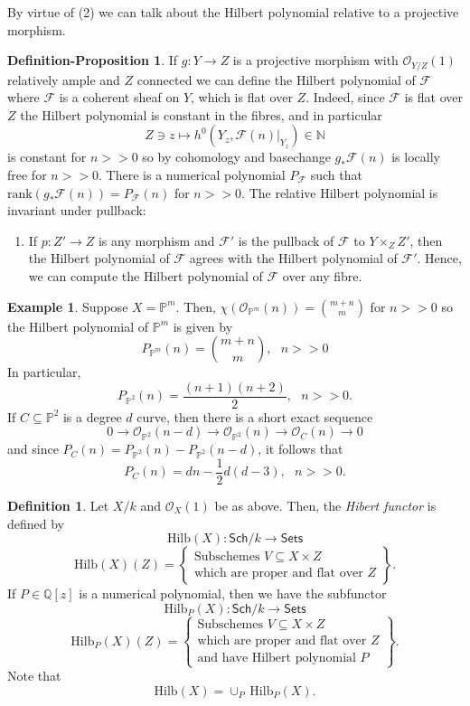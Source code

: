 \documentclass[12pt]{amsart}
\numberwithin{equation}{section}
\theoremstyle{definition}
\newtheorem{definition}[theorem]{Definition}
\newtheorem{example}[theorem]{Example}
\newtheorem{defprop}[theorem]{Definition-Proposition}
\newcommand{\NN}{\mathbb{N}}
\newcommand{\PP}{\mathbb{P}}
\newcommand{\QQ}{\mathbb{Q}}
\newcommand{\cF}{\mathcal{F}}
\newcommand{\Hilb}{\mathrm{Hilb}}
\begin{document}
By virtue of (2) we can talk about the Hilbert polynomial relative to a projective morphism.

\begin{defprop}
    If $g : Y \to Z$ is a projective morphism with $\mathcal{O}_{Y/Z}(1)$ relatively ample and $Z$ connected we can define the Hilbert polynomial of $\cF$ where $\cF$ is a coherent sheaf on $Y$, which is flat over $Z$. 
Indeed, since $\cF$ is flat over $Z$ the Hilbert polynomial is constant in the fibres, and in particular
\[
Z \ni z \mapsto h^0(Y_z, \cF(n) |_{Y_z}) \in \NN
\]
is constant for $n > > 0$ so by cohomology and basechange $g_* \cF(n)$ is locally free for $n > > 0.$
There is a numerical polynomial $P_{\cF}$ such that $\mathrm{rank}(g_*\cF(n)) = P_{\cF}(n)$ for $n > > 0.$
The relative Hilbert polynomial is invariant under pullback:
\begin{enumerate}
    \item If $p : Z' \to Z$ is any morphism and $\cF'$ is the pullback of $\cF$ to $Y \times_Z Z'$, then the Hilbert polynomial of $\cF$ agrees with the Hilbert polynomial of $\cF'.$
    Hence, we can compute the Hilbert polynomial of $\cF$ over any fibre.  
\end{enumerate}
\end{defprop}

\begin{example}
Suppose $X = \PP^m$. Then, $\chi(\mathcal{O}_{\PP^m}(n)) = {{m+n}\choose m}$ for $n > > 0$ so the Hilbert polynomial of $\PP^m$ is given by
\[
P_{\PP^m}(n) = {{m+n}\choose{m}}, \ \ \ n > > 0
\]
In particular,
\[
P_{\PP^2}(n) = \frac{(n+1)(n+2)}{2}, \ \ \ n > > 0.
\]
If $C \subseteq \PP^2$ is a degree $d$ curve, then there is a short exact sequence
\[
0 \to \mathcal{O}_{\PP^2}(n-d) \to \mathcal{O}_{\PP^2}(n) \to \mathcal{O}_C(n) \to 0
\]
and since $P_C(n) = P_{\PP^2}(n) - P_{\PP^2}(n-d)$, it follows that
\[
P_C(n) = dn - \frac{1}{2}d(d-3), \ \ \ n > > 0.
\]
\end{example}    

\begin{definition}
    Let $X/k$ and $\mathcal{O}_X(1)$ be as above. Then, the {\em Hibert functor} is defined by
    \[
    \Hilb(X) : \mathsf{Sch}/k \to \mathsf{Sets}
    \]
    \[
    \Hilb(X)(Z)= \left \{\substack{\mbox{Subschemes $V \subseteq X \times Z$} \\ \mbox{which are proper and flat over $Z$}}\right \}.
    \]
    If $P \in \QQ[z]$ is a numerical polynomial, then we have the subfunctor
    \[
    \Hilb_P(X) : \mathsf{Sch}/k \to \mathsf{Sets}
    \]
    \[
    \Hilb_P(X)(Z) = \left \{\substack{\mbox{Subschemes $V \subseteq X \times Z$} \\ \mbox{which are proper and flat over $Z$} \\ \mbox{and have Hilbert polynomial $P$}}\right \}.
    \]
    Note that 
    \[
    \Hilb(X) = \cup_P \, \Hilb_P(X).
    \]
\end{definition}
\end{document}
